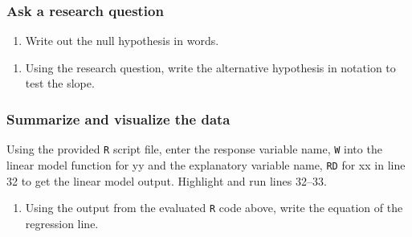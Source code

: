 \documentclass[
]{report}
\newenvironment{Shaded}{\begin{snugshade}}{\end{snugshade}}
\newcommand{\CommentTok}[1]{\textcolor[rgb]{0.56,0.35,0.01}{\textit{#1}}}
\newcommand{\DataTypeTok}[1]{\textcolor[rgb]{0.13,0.29,0.53}{#1}}
\newcommand{\DecValTok}[1]{\textcolor[rgb]{0.00,0.00,0.81}{#1}}
\newcommand{\KeywordTok}[1]{\textcolor[rgb]{0.13,0.29,0.53}{\textbf{#1}}}
\newcommand{\NormalTok}[1]{#1}
\newcommand{\OperatorTok}[1]{\textcolor[rgb]{0.81,0.36,0.00}{\textbf{#1}}}
\newcommand{\StringTok}[1]{\textcolor[rgb]{0.31,0.60,0.02}{#1}}
\providecommand{\tightlist}{%
  \setlength{\itemsep}{0pt}\setlength{\parskip}{0pt}}
\begin{document}
\hypertarget{ask-a-research-question-4}{%
\subsubsection*{Ask a research question}\label{ask-a-research-question-4}}

\begin{enumerate}
\def\labelenumi{\arabic{enumi}.}
\setcounter{enumi}{5}
\tightlist
\item
  Write out the null hypothesis in words.
\end{enumerate}

\vspace{1in}

\begin{enumerate}
\def\labelenumi{\arabic{enumi}.}
\setcounter{enumi}{6}
\tightlist
\item
  Using the research question, write the alternative hypothesis in notation to test the slope.
\end{enumerate}

\vspace{0.5in}

\hypertarget{summarize-and-visualize-the-data-4}{%
\subsubsection*{Summarize and visualize the data}\label{summarize-and-visualize-the-data-4}}

Using the provided \texttt{R} script file, enter the response variable name, \texttt{W} into the linear model function for yy and the explanatory variable name, \texttt{RD} for xx in line 32 to get the linear model output. Highlight and run lines 32--33.

\begin{Shaded}
\end{Shaded}

\begin{enumerate}
\def\labelenumi{\arabic{enumi}.}
\setcounter{enumi}{7}
\tightlist
\item
  Using the output from the evaluated \texttt{R} code above, write the equation of the regression line.
\end{enumerate}
\end{document}

